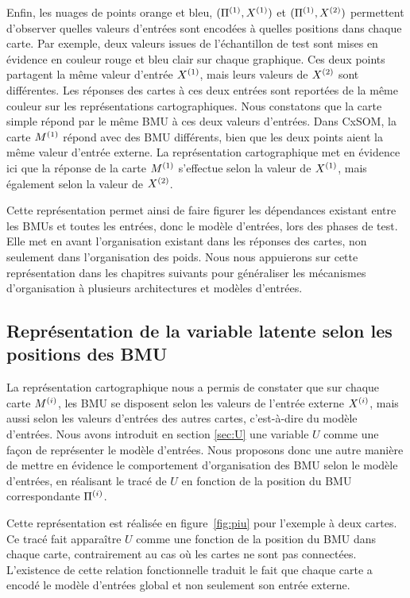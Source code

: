 \documentclass[../main]{subfiles}
\begin{document}
Enfin, les nuages de points orange et bleu, $(\Pi^{({1})},X^{({1})})$ et $(\Pi^{({1})},X^{({2})})$ permettent d'observer quelles valeurs d'entrées sont encodées à quelles positions dans chaque carte.
Par exemple, deux valeurs issues de l'échantillon de test sont mises en évidence en couleur rouge et bleu clair sur chaque graphique.
Ces deux points partagent la même valeur d'entrée $X^{({1})}$, mais leurs valeurs de $X^{({2})}$ sont différentes. Les réponses des cartes à ces deux entrées sont reportées de la même couleur sur les représentations cartographiques. Nous constatons que la carte simple répond par le même BMU à ces deux valeurs d'entrées. Dans CxSOM, la carte $M^{({1})}$ répond avec des BMU différents, bien que les deux points aient la même valeur d'entrée externe. La représentation cartographique met en évidence ici que la réponse de la carte $M^{({1})}$ s'effectue selon la valeur de $X^{({1})}$, mais également selon la valeur de $X^{({2})}$. 

Cette représentation permet ainsi de faire figurer les dépendances existant entre les BMUs et toutes les entrées, donc le modèle d'entrées, lors des phases de test. Elle met en avant l'organisation existant dans les réponses des cartes, non seulement dans l'organisation des poids.
Nous nous appuierons sur cette représentation dans les chapitres suivants pour généraliser les mécanismes d'organisation à plusieurs architectures et modèles d'entrées.

\subsection{Représentation de la variable latente selon les positions des BMU}\label{sec:u_bmu}

La représentation cartographique nous a permis de constater que sur chaque carte $M^{({i})}$, les BMU se disposent selon les valeurs de l'entrée externe $X^{({i})}$, mais aussi selon les valeurs d'entrées des autres cartes, c'est-à-dire du modèle d'entrées.
Nous avons introduit en section \ref{sec:U} une variable $U$ comme une façon de représenter le modèle d'entrées. 
Nous proposons donc une autre manière de mettre en évidence le comportement d'organisation des BMU selon le modèle d'entrées, en réalisant le tracé de $U$ en fonction de la position du BMU correspondante $\Pi^{({i})}$.

Cette représentation est réalisée en figure~\ref{fig:piu} pour l'exemple à deux cartes.
Ce tracé fait apparaître $U$ comme une fonction de la position du BMU dans chaque carte, contrairement au cas où les cartes ne sont pas connectées. 
L'existence de cette relation fonctionnelle traduit le fait que chaque carte a encodé le modèle d'entrées global et non seulement son entrée externe.
\end{document}
